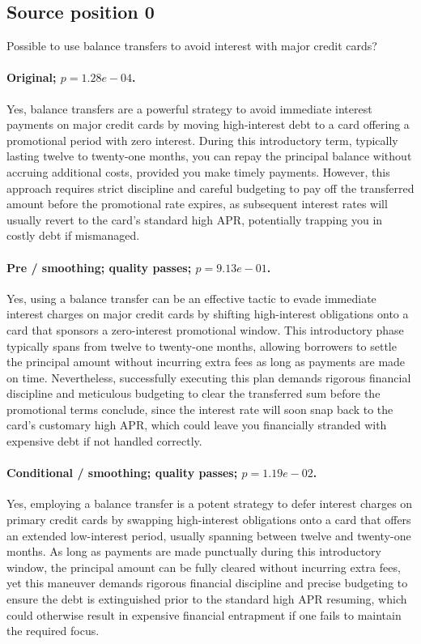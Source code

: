 \subsection*{Source position 0}
Possible to use balance transfers to avoid interest with major credit cards?

\paragraph{Original; $p=1.28e-04$.} Yes, balance transfers are a powerful strategy to avoid immediate interest payments on major credit cards by moving high-interest debt to a card offering a promotional period with zero interest. During this introductory term, typically lasting twelve to twenty-one months, you can repay the principal balance without accruing additional costs, provided you make timely payments. However, this approach requires strict discipline and careful budgeting to pay off the transferred amount before the promotional rate expires, as subsequent interest rates will usually revert to the card's standard high APR, potentially trapping you in costly debt if mismanaged.


\paragraph{Pre / smoothing; quality passes; $p=9.13e-01$.} Yes, using a balance transfer can be an effective tactic to evade immediate interest charges on major credit cards by shifting high-interest obligations onto a card that sponsors a zero-interest promotional window. This introductory phase typically spans from twelve to twenty-one months, allowing borrowers to settle the principal amount without incurring extra fees as long as payments are made on time. Nevertheless, successfully executing this plan demands rigorous financial discipline and meticulous budgeting to clear the transferred sum before the promotional terms conclude, since the interest rate will soon snap back to the card's customary high APR, which could leave you financially stranded with expensive debt if not handled correctly.

\paragraph{Conditional / smoothing; quality passes; $p=1.19e-02$.} Yes, employing a balance transfer is a potent strategy to defer interest charges on primary credit cards by swapping high-interest obligations onto a card that offers an extended low-interest period, usually spanning between twelve and twenty-one months. As long as payments are made punctually during this introductory window, the principal amount can be fully cleared without incurring extra fees, yet this maneuver demands rigorous financial discipline and precise budgeting to ensure the debt is extinguished prior to the standard high APR resuming, which could otherwise result in expensive financial entrapment if one fails to maintain the required focus.

